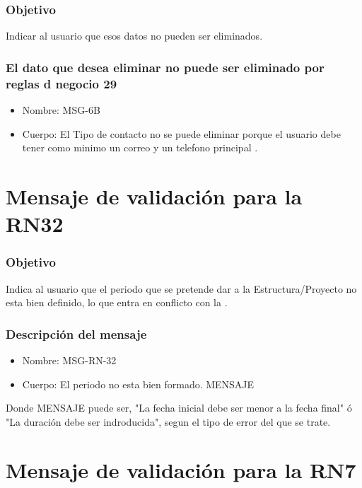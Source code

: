 \subsubsection{Objetivo}
Indicar al usuario que esos datos no pueden ser eliminados.

\subsubsection{El dato que desea eliminar no puede ser eliminado por reglas d negocio 29}
\begin{itemize}
\item Nombre: MSG-6B
\item Cuerpo: El Tipo de contacto no se puede eliminar porque el usuario debe tener como minimo un correo y un telefono principal .
\end{itemize}


\section{Mensaje de validación para la RN32} \label{MSG_RN32}

\subsubsection{Objetivo}
Indica al usuario que el periodo que se pretende dar a la Estructura/Proyecto no esta bien definido, lo que entra en conflicto con la .

\subsubsection{Descripción del mensaje}
\begin{itemize}
\item Nombre: MSG-RN-32
\item Cuerpo: El periodo no esta bien formado. MENSAJE
\end{itemize}
Donde MENSAJE puede ser, "La fecha inicial debe ser menor a la fecha final" ó "La duración debe ser indroducida", segun el tipo de error del que se trate. 

\section{Mensaje de validación para la RN7} \label{MSG_RN7}

